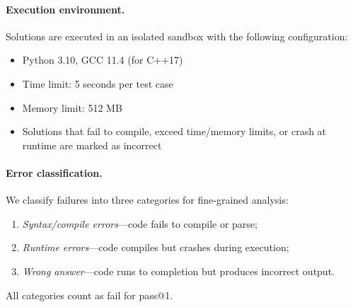 \documentclass[]{bytedance_seed}
\theoremstyle{plain}
\theoremstyle{definition}
\theoremstyle{remark}
\begin{document}
\paragraph{Execution environment.}
Solutions are executed in an isolated sandbox with the following configuration:
\begin{itemize}
    \item Python 3.10, GCC 11.4 (for C++17)
    \item Time limit: 5 seconds per test case
    \item Memory limit: 512 MB
    \item Solutions that fail to compile, exceed time/memory limits, or crash at runtime are marked as incorrect
\end{itemize}

\paragraph{Error classification.}
We classify failures into three categories for fine-grained analysis:
\begin{enumerate}
    \item \textit{Syntax/compile errors}---code fails to compile or parse;
    \item \textit{Runtime errors}---code compiles but crashes during execution;
    \item \textit{Wrong answer}---code runs to completion but produces incorrect output.
\end{enumerate}
All categories count as fail for pass@1.
\end{document}
